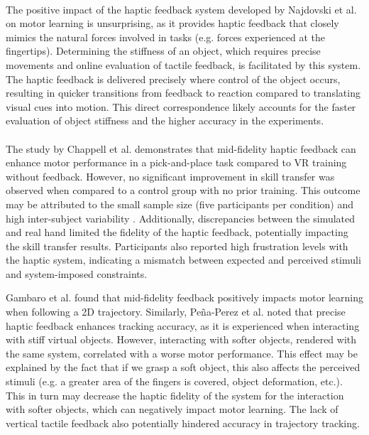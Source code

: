 \paragraph{}
The positive impact of the haptic feedback system developed by Najdovski et al. on motor learning is unsurprising, as it provides haptic feedback that closely mimics the natural forces involved in tasks (e.g. forces experienced at the fingertips). Determining the stiffness of an object, which requires precise movements and online evaluation of tactile feedback, is facilitated by this system. The haptic feedback is delivered precisely where control of the object occurs, resulting in quicker transitions from feedback to reaction compared to translating visual cues into motion. This direct correspondence likely accounts for the faster evaluation of object stiffness and the higher accuracy in the experiments.


\paragraph{}
The study by Chappell et al. demonstrates that mid-fidelity haptic feedback can enhance motor performance in a pick-and-place task compared to VR training without feedback. However, no significant improvement in skill transfer was observed when compared to a control group with no prior training. This outcome may be attributed to the small sample size (five participants per condition) and high inter-subject variability \cite{Chappell2022}. Additionally, discrepancies between the simulated and real hand limited the fidelity of the haptic feedback, potentially impacting the skill transfer results. Participants also reported high frustration levels with the haptic system, indicating a mismatch between expected and perceived stimuli and system-imposed constraints.

Gambaro et al. found that mid-fidelity feedback positively impacts motor learning when following a 2D trajectory. 
Similarly, Peña-Perez et al. noted that precise haptic feedback enhances tracking accuracy, as it is experienced when interacting with stiff virtual objects. However, interacting with softer objects, rendered with the same system, correlated with a worse motor performance. This effect may be explained by the fact that if we grasp a soft object, this also affects the perceived stimuli (e.g. a greater area of the fingers is covered, object deformation, etc.). This in turn may decrease the haptic fidelity of the system for the interaction with softer objects, which can negatively impact motor learning. The lack of vertical tactile feedback also potentially hindered accuracy in trajectory tracking.


